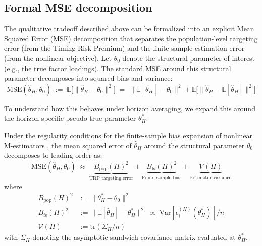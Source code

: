 \subsection{Formal MSE decomposition}
\label{sec:appendix_mse_decomposition}

The qualitative tradeoff described above can be formalized into an explicit Mean Squared Error (MSE) decomposition that separates the population-level targeting error (from the Timing Risk Premium) and the finite-sample estimation error (from the nonlinear objective).
Let $\theta_0$ denote the structural parameter of interest (e.g., the true factor loadings).
The standard MSE around this structural parameter decomposes into squared bias and variance:
\begin{equation}
	\label{eq:mse_general}
	\mathrm{MSE}(\hat{\theta}_H, \theta_0) 
	\;:=\; \mathbb{E}\big[\|\hat{\theta}_H - \theta_0\|^2\big]
	\;=\; \|\mathbb{E}[\hat{\theta}_H] - \theta_0\|^2 + \mathbb{E}\big[\|\hat{\theta}_H - \mathbb{E}[\hat{\theta}_H]\|^2\big]
\end{equation}

To understand how this behaves under horizon averaging, we expand this around the horizon-specific pseudo-true parameter $\theta^*_H$.
\begin{proposition}
	\label{prop:mse_decomp}
	Under the regularity conditions for the finite-sample bias expansion of nonlinear M-estimators \citep{rilstone1996second, bao2007finite}, the mean squared error of $\hat{\theta}_H$ around the structural parameter $\theta_0$ decomposes to leading order as:
	\begin{equation}
		\label{eq:mse_leading_order}
		\mathrm{MSE}(\hat{\theta}_H, \theta_0) 
		\;\approx\; 
		\underbrace{B_{\text{pop}}(H)^2}_{\text{TRP targeting error}} + 
		\underbrace{B_{\text{fs}}(H)^2}_{\text{Finite-sample bias}} + 
		\underbrace{\mathcal{V}(H)}_{\text{Estimator variance}}
	\end{equation}
	where
	\begin{align*}
		B_{\text{pop}}(H)^2 &:= \|\theta^*_H - \theta_0\|^2 \\
		B_{\text{fs}}(H)^2  &:= \|\mathbb{E}[\hat{\theta}_H] - \theta^*_H\|^2 \;\propto\; \mathrm{Var}[\bar{\epsilon}_i^{(H)}(\theta^*_H)] / n \\
		\mathcal{V}(H)      &:= \mathrm{tr}(\Sigma_H / n)
	\end{align*}
	with $\Sigma_H$ denoting the asymptotic sandwich covariance matrix evaluated at $\theta^*_H$.
\end{proposition}

